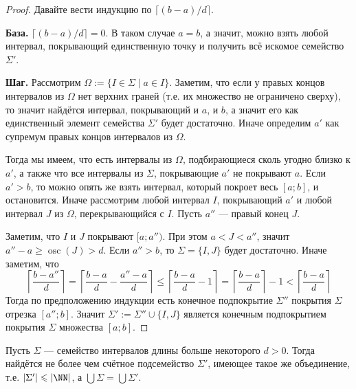\documentclass[12pt,a4paper]{article}
\DeclareMathOperator*{\osc}{osc}
\begin{document}
    \begin{proof}
        Давайте вести индукцию по $\lceil (b-a)/d \rceil$.

        \textbf{База.} $\lceil (b-a)/d \rceil = 0$. В таком случае $a = b$, а значит, можно взять любой интервал, покрывающий единственную точку и получить всё искомое семейство $\Sigma'$.

        \textbf{Шаг.} Рассмотрим $\Omega := \{I \in \Sigma \mid a \in I\}$. Заметим, что если у правых концов интервалов из $\Omega$ нет верхних граней (т.е. их множество не ограничено сверху), то значит найдётся интервал, покрывающий и $a$, и $b$, а значит его как единственный элемент семейства $\Sigma'$ будет достаточно. Иначе определим $a'$ как супремум правых концов интервалов из $\Omega$.
        
        Тогда мы имеем, что есть интервалы из $\Omega$, подбирающиеся сколь угодно близко к $a'$, а также что все интервалы из $\Sigma$, покрывающие $a'$ не покрывают $a$. Если $a' > b$, то можно опять же взять интервал, который покроет весь $[a; b]$, и остановится. Иначе рассмотрим любой интервал $I$, покрывающий $a'$ и любой интервал $J$ из $\Omega$, перекрывающийся с $I$. Пусть $a''$ --- правый конец $J$.

        Заметим, что $I$ и $J$ покрывают $[a; a'')$. При этом $a < J < a''$, значит $a'' - a \geqslant \osc(J) > d$. Если $a'' > b$, то $\Sigma = \{I, J\}$ будет достаточно. Иначе заметим, что
        \[
            \left\lceil \frac{b-a''}{d} \right\rceil =
            \left\lceil \frac{b-a}{d} - \frac{a''-a}{d} \right\rceil \leqslant
            \left\lceil \frac{b-a}{d} - 1 \right\rceil =
            \left\lceil \frac{b-a}{d} \right\rceil - 1 <
            \left\lceil \frac{b-a}{d} \right\rceil
        \]
        Тогда по предположению индукции есть конечное подпокрытие $\Sigma''$ покрытия $\Sigma$ отрезка $[a''; b]$. Значит $\Sigma' := \Sigma'' \cup \{I, J\}$ является конечным подпокрытием покрытия $\Sigma$ множества $[a; b]$.
    \end{proof}

    \begin{lemma}\label{edged_subcover_great_lemma}
        Пусть $\Sigma$ --- семейство интервалов длины больше некоторого $d > 0$. Тогда найдётся не более чем счётное подсемейство $\Sigma'$, имеющее такое же объединение, т.е. $|\Sigma'| \leqslant |\NN|$, а $\bigcup \Sigma = \bigcup \Sigma'$.
    \end{lemma}
\end{document}
